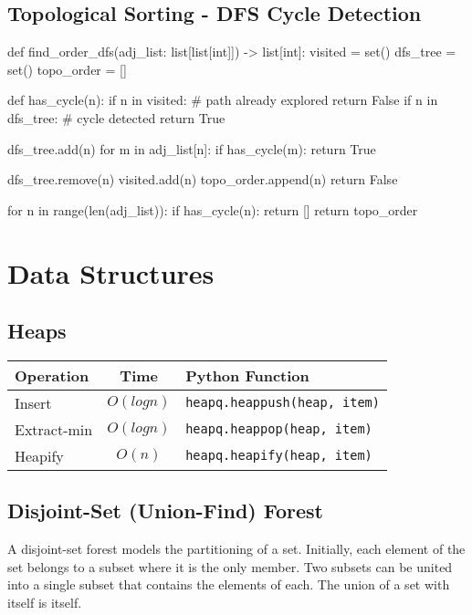 \documentclass[12pt]{article}
\begin{document}
\subsection{Topological Sorting - DFS Cycle Detection}
\begin{python}
def find_order_dfs(adj_list: list[list[int]]) -> list[int]:
    visited = set()
    dfs_tree = set()
    topo_order = []

    def has_cycle(n):
        if n in visited:  # path already explored
            return False
        if n in dfs_tree:  # cycle detected
            return True

        dfs_tree.add(n)
        for m in adj_list[n]:
            if has_cycle(m):
                return True

        dfs_tree.remove(n)
        visited.add(n)
        topo_order.append(n)
        return False

    for n in range(len(adj_list)):
        if has_cycle(n):
            return []
    return topo_order
\end{python}

\section{Data Structures}

\subsection{Heaps}
\begin{center}
\begin{tabular}{|l|c|l|}
  \hline
  \textbf{Operation} & \textbf{Time} & \textbf{Python Function} \\
  \hline
  Insert & $O(logn)$ & \texttt{heapq.heappush(heap, item)} \\
  Extract-min & $O(logn)$ & \texttt{heapq.heappop(heap, item)} \\
  Heapify & $O(n)$ & \texttt{heapq.heapify(heap, item)} \\
  \hline
\end{tabular}
\end{center}

\subsection{Disjoint-Set (Union-Find) Forest}
A disjoint-set forest models the partitioning of a set. Initially, each element of the set belongs to a subset where it is the only member. Two subsets can be united into a single subset that contains the elements of each. The union of a set with itself is itself. \\
\end{document}
